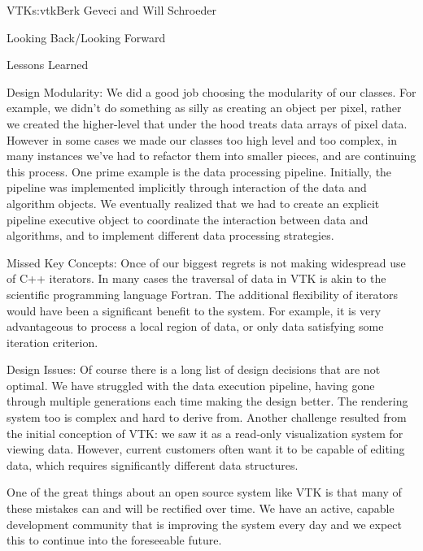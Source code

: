 \begin{aosachapter}{VTK}{s:vtk}{Berk Geveci and Will Schroeder}
\begin{aosasect1}{Looking Back/Looking Forward}
\begin{aosasect2}{Lessons Learned}
\begin{aosadescription}
  \item{Design Modularity}: We did a good job choosing the
  modularity of our classes. For example, we didn't do something as
  silly as creating an object per pixel, rather we created the
  higher-level  that under the hood treats data arrays of
  pixel data. However in some cases we made our classes too high level
  and too complex, in many instances we've had to refactor them into
  smaller pieces, and are continuing this process. One prime example
  is the data processing pipeline.  Initially, the pipeline was
  implemented implicitly through interaction of the data and algorithm
  objects. We eventually realized that we had to create an explicit
  pipeline executive object to coordinate the interaction between data
  and algorithms, and to implement different data processing
  strategies.

  \item{Missed Key Concepts}: Once of our biggest regrets is not
  making widespread use of C++ iterators. In many cases the traversal
  of data in VTK is akin to the scientific programming language
  Fortran\@. The additional flexibility of iterators would have been a
  significant benefit to the system. For example, it is very
  advantageous to process a local region of data, or only data
  satisfying some iteration criterion.

  \item{Design Issues}: Of course there is a long list of design
  decisions that are not optimal. We have struggled with the data
  execution pipeline, having gone through multiple generations each
  time making the design better. The rendering system too is complex
  and hard to derive from. Another challenge resulted from the initial
  conception of VTK: we saw it as a read-only visualization system for
  viewing data. However, current customers often want it to be capable
  of editing data, which requires significantly different data
  structures.

\end{aosadescription}

One of the great things about an open source system like VTK is that
many of these mistakes can and will be rectified over time. We have an
active, capable development community that is improving the system
every day and we expect this to continue into the foreseeable future.

\end{aosasect2}

\end{aosasect1}

\end{aosachapter}

